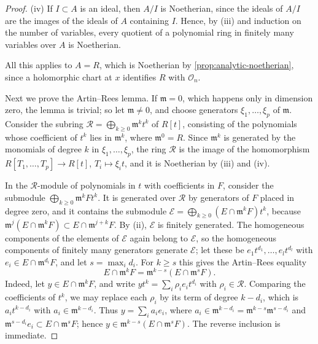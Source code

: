 \begin{proof}
(iv) If $I\subset A$ is an ideal, then $A/I$ is Noetherian, since the ideals of $A/I$ are the images of the ideals of $A$ containing $I$. Hence, by (iii) and induction on the number of variables, every quotient of a polynomial ring in finitely many variables over $A$ is Noetherian.

All this applies to $A=R$, which is Noetherian by \cref{prop:analytic-noetherian}, since a holomorphic chart at $x$ identifies $R$ with $\mathcal O_n$.

Next we prove the Artin--Rees lemma. If $\mathfrak m=0$, which happens only in dimension zero, the lemma is trivial; so let $\mathfrak m\neq0$, and choose generators $\xi_1,\ldots,\xi_p$ of $\mathfrak m$. Consider the subring $\mathcal R=\bigoplus_{k\geq0}\mathfrak m^kt^k$ of $R[t]$, consisting of the polynomials whose coefficient of $t^k$ lies in $\mathfrak m^k$, where $\mathfrak m^0=R$. Since $\mathfrak m^k$ is generated by the monomials of degree $k$ in $\xi_1,\ldots,\xi_p$, the ring $\mathcal R$ is the image of the homomorphism $R[T_1,\ldots,T_p]\to R[t]$, $T_i\mapsto\xi_it$, and it is Noetherian by (iii) and (iv).

In the $\mathcal R$-module of polynomials in $t$ with coefficients in $F$, consider the submodule $\bigoplus_{k\geq0}\mathfrak m^kFt^k$. It is generated over $\mathcal R$ by generators of $F$ placed in degree zero, and it contains the submodule $\mathcal E=\bigoplus_{k\geq0}(E\cap\mathfrak m^kF)t^k$, because $\mathfrak m^j(E\cap\mathfrak m^kF)\subset E\cap\mathfrak m^{j+k}F$. By (ii), $\mathcal E$ is finitely generated. The homogeneous components of the elements of $\mathcal E$ again belong to $\mathcal E$, so the homogeneous components of finitely many generators generate $\mathcal E$; let these be $e_1t^{d_1},\ldots,e_lt^{d_l}$ with $e_i\in E\cap\mathfrak m^{d_i}F$, and let $s=\max_id_i$. For $k\geq s$ this gives the Artin--Rees equality
\[
 E\cap\mathfrak m^kF=\mathfrak m^{k-s}(E\cap\mathfrak m^sF).
\]
Indeed, let $y\in E\cap\mathfrak m^kF$, and write $yt^k=\sum_i\rho_ie_it^{d_i}$ with $\rho_i\in\mathcal R$. Comparing the coefficients of $t^k$, we may replace each $\rho_i$ by its term of degree $k-d_i$, which is $a_it^{k-d_i}$ with $a_i\in\mathfrak m^{k-d_i}$. Thus $y=\sum_ia_ie_i$, where $a_i\in\mathfrak m^{k-d_i}=\mathfrak m^{k-s}\mathfrak m^{s-d_i}$ and $\mathfrak m^{s-d_i}e_i\subset E\cap\mathfrak m^sF$; hence $y\in\mathfrak m^{k-s}(E\cap\mathfrak m^sF)$. The reverse inclusion is immediate.


\end{proof}

